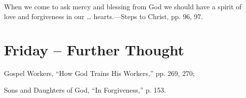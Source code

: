 \documentclass[a4paper, 10pt, twoside, headings=small]{scrartcl}
\begin{document}
\begin{multicols}{2}
When we come to ask mercy and blessing from God we should have a spirit of love and forgiveness in our … hearts.—Steps to Christ, pp. 96, 97.

\section*{Friday – Further Thought}

\setlength{\parindent}{0pt}Gospel Workers, “How God Trains His Workers,” pp. 269, 270;

Sons and Daughters of God, “In Forgiveness,” p. 153.

\end{multicols}
\end{document}
